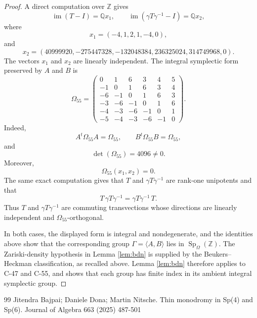 \documentclass[10pt,a4paper]{amsart}
\DeclareMathOperator{\Sp}{Sp}
\newcommand{\ZZ}{\mathbb{Z}}
\newcommand{\QQ}{\mathbb{Q}}
\begin{document}
\begin{proof}
A direct computation over $\ZZ$ gives
\[
  \operatorname{im}(T-I)=\QQ x_1,\qquad
  \operatorname{im}(\gamma T\gamma^{-1}-I)=\QQ x_2,
\]
where
\[
  x_1=(-4,1,2,1,-4,0),
\]
and
\[
  x_2=(40999920,-275447328,-132048384,
       236325024,314749968,0).
\]
The vectors $x_1$ and $x_2$ are linearly independent. 
The integral
symplectic form preserved by $A$ and $B$ is
\[
\Omega_{55}=\begin{pmatrix}
0&1&6&3&4&5\\
-1&0&1&6&3&4\\
-6&-1&0&1&6&3\\
-3&-6&-1&0&1&6\\
-4&-3&-6&-1&0&1\\
-5&-4&-3&-6&-1&0
\end{pmatrix}.
\]
Indeed,
\[
  A^t\Omega_{55}A=\Omega_{55},\qquad
  B^t\Omega_{55}B=\Omega_{55},
\]
and
\[
  \det(\Omega_{55})=4096\neq 0.
\]
Moreover,
\[
  \Omega_{55}(x_1,x_2)=0.
\]
The same exact computation gives that $T$ and $\gamma T\gamma^{-1}$ are
rank-one unipotents and that
\[
  T \, \gamma T \gamma^{-1} = \gamma T \gamma^{-1} \, T . %
\]
Thus $T$ and $\gamma T\gamma^{-1}$ are commuting transvections whose
directions are linearly independent and $\Omega_{55}$-orthogonal.

In both cases, the displayed form is integral and nondegenerate, and the
identities above show that the corresponding group
$\Gamma=\langle A,B\rangle$ lies in $\Sp_\Omega(\ZZ)$.  The Zariski-density
hypothesis in Lemma \ref{lem:bdn} is supplied by the Beukers--Heckman
classification, as recalled above.  Lemma \ref{lem:bdn} therefore applies to
C-47 and C-55, and shows that each group has finite index in its ambient
integral symplectic group.
\end{proof}


\begin{thebibliography}{99}
 Jitendra Bajpai; Daniele Dona; Martin Nitsche. Thin monodromy in {S}p(4) and {S}p(6). Journal of Algebra 663 (2025) 487-501
\end{thebibliography}
\end{document}
